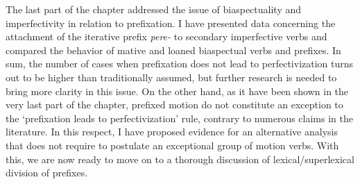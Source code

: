 The last part of the chapter addressed the issue of biaspectuality and imperfectivity in relation to prefixation. I have presented data concerning the attachment of the iterative prefix \textit{pere-} to secondary imperfective verbs and compared the behavior of mative and loaned biaspectual verbs and prefixes. In sum, the number of cases when prefixation does not lead to perfectivization turns out to be higher than traditionally assumed, but further research is needed to bring more clarity in this issue. On the other hand, as it have been shown in the very last part of the chapter, prefixed motion do not constitute an exception to the `prefixation leads to perfectivization' rule, contrary to numerous claims in the literature. In this respect, I have proposed evidence for an alternative analysis that does not require to postulate an exceptional group of motion verbs. With this, we are now ready to move on to a thorough discussion of lexical/superlexical division of prefixes.

